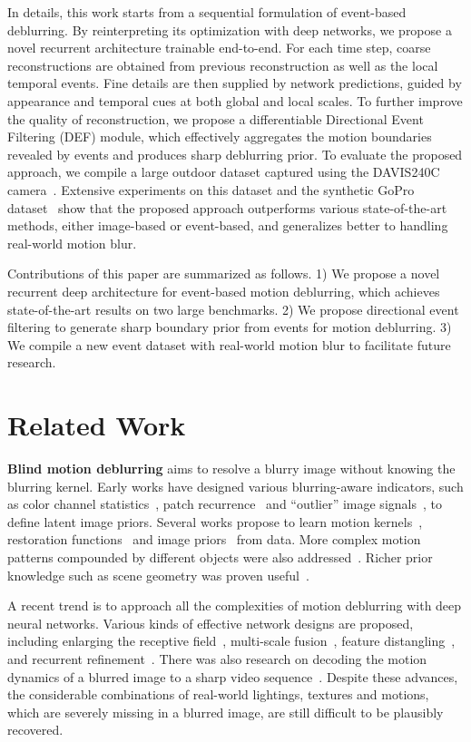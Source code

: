 \documentclass[10pt,twocolumn,letterpaper]{article}
\begin{document}
In details, this work starts from a sequential formulation of event-based deblurring. By reinterpreting its optimization with deep networks, we propose a novel recurrent architecture trainable end-to-end. For each time step, coarse reconstructions are obtained from previous reconstruction as well as the local temporal events. Fine details are then supplied by network predictions, guided by appearance and temporal cues at both global and local scales. To further improve the quality of reconstruction, we propose a differentiable Directional Event Filtering (DEF) module, which effectively aggregates the motion boundaries revealed by events and produces sharp deblurring prior. To evaluate the proposed approach, we compile a large outdoor dataset captured using the DAVIS240C camera~\cite{BrandliJSSC14}. Extensive experiments on this dataset and the synthetic GoPro dataset~\cite{NahCVPR17} show that the proposed approach outperforms various state-of-the-art methods, either image-based or event-based, and generalizes better to handling real-world motion blur.

Contributions of this paper are summarized as follows. 1) We propose a novel recurrent deep architecture for event-based motion deblurring, which achieves state-of-the-art results on two large benchmarks. 2) We propose directional event filtering to generate sharp boundary prior from events for motion deblurring. 3) We compile a new event dataset with real-world motion blur to facilitate future research.

\section{Related Work}
\textbf{Blind motion deblurring} aims to resolve a blurry image without knowing the blurring kernel. Early works have designed various blurring-aware indicators, such as color channel statistics~\cite{PanCVPR16,YanCVPR17}, patch recurrence~\cite{MichaeliECCV14} and ``outlier'' image signals~\cite{DongICCV17}, to define latent image priors. Several works propose to learn motion kernels~\cite{SchmidtCVPR13,PanCVPR17}, restoration functions~\cite{XiaoECCV16,GongCVPR17} and image priors~\cite{ZuoCVPR15,SunCVPR15} from data. More complex motion patterns compounded by different objects were also addressed~\cite{KimICCV13,RenICCV17}. Richer prior knowledge such as scene geometry was proven useful~\cite{PanLCVPR17,ParkICCV17}.

A recent trend is to approach all the complexities of motion deblurring with deep neural networks. Various kinds of effective network designs are proposed, including enlarging the receptive field~\cite{ZhangCVPR18}, multi-scale fusion~\cite{NahCVPR17,NorooziGCPR17}, feature distangling~\cite{NimishaICCV17}, and recurrent refinement~\cite{WieschollekICCV17}. There was also research on decoding the motion dynamics of a blurred image to a sharp video sequence~\cite{JinCVPR18}. Despite these advances, the considerable combinations of real-world lightings, textures and motions, which are severely missing in a blurred image, are still difficult to be plausibly recovered.
\end{document}
